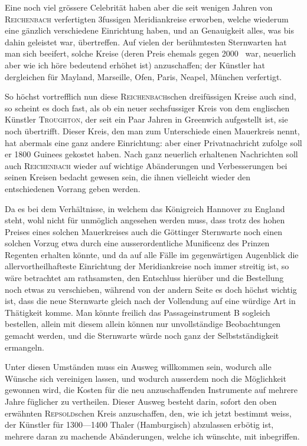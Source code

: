 Eine noch viel grössere Celebrität haben aber die seit wenigen Jahren von \textsc{Reichenbach} verfertigten 3fussigen Meridiankreise erworben, welche wiederum eine gänzlich verschiedene Einrichtung haben, und an Genauigkeit alles, was bis dahin geleistet war, übertreffen. Auf vielen der berühmtesten Sternwarten hat man sich beeifert, solche Kreise (deren Preis ehemals gegen 2000 \InstrumentMoneyMark\ war, neuerlich aber wie ich höre bedeutend erhöhet ist) anzuschaffen; der Künstler hat dergleichen für Mayland, Marseille, Ofen, Paris, Neapel, München verfertigt.

So höchst vortrefflich nun diese \textsc{Reichenbach}schen dreifüssigen Kreise auch sind, so scheint es doch fast, als ob ein neuer sechsfussiger Kreis von dem englischen Künstler \textsc{Troughton}, der seit ein Paar Jahren in Greenwich aufgestellt ist, sie noch übertrifft. Dieser Kreis, den man zum Unterschiede einen Mauerkreis nennt, hat abermals eine ganz andere Einrichtung: aber einer Privatnachricht zufolge soll er 1800 Guinees gekostet haben. Nach ganz neuerlich erhaltenen Nachrichten soll auch \textsc{Reichenbach} wieder auf wichtige
\clearpage{}
\noindent Abänderungen und Verbesserungen bei seinen Kreisen bedacht gewesen sein, die ihnen vielleicht wieder den entschiedenen Vorrang geben werden.

Da es bei dem Verhältnisse, in welchem das Königreich Hannover zu England steht, wohl nicht für unmöglich angesehen werden muss, dass trotz des hohen Preises eines solchen Mauerkreises auch die Göttinger Sternwarte noch einen solchen Vorzug etwa durch eine ausserordentliche Munificenz des Prinzen Regenten erhalten könnte, und da auf alle Fälle im gegenwärtigen Augenblick die allervortheilhafteste Einrichtung der Meridiankreise noch immer streitig ist, so wäre  betrachtet am rathsamsten, den Entschluss hierüber und die Bestellung noch etwas zu verschieben, während von der andern Seite es doch höchst wichtig ist, dass die neue Sternwarte gleich nach der Vollendung auf eine würdige Art in Thätigkeit komme. Man könnte freilich das Passageinstrument B sogleich bestellen, allein mit diesem allein können nur unvollständige Beobachtungen gemacht werden, und die Sternwarte würde noch ganz der Selbstständigkeit ermangeln.

Unter diesen Umständen muss ein Ausweg willkommen sein, wodurch alle Wünsche sich vereinigen lassen, und wodurch ausserdem noch die Möglichkeit gewonnen wird, die Kosten für die neu anzuschaffenden Instrumente auf mehrere Jahre füglicher zu vertheilen. Dieser Ausweg besteht darin, sofort den oben erwähnten \textsc{Repsold}schen Kreis anzuschaffen, den, wie ich jetzt bestimmt weiss, der Künstler für 1300—1400 Thaler (Hamburgisch) abzulassen erbötig ist, mehrere daran zu machende Abänderungen, welche ich wünschte, mit inbegriffen.

